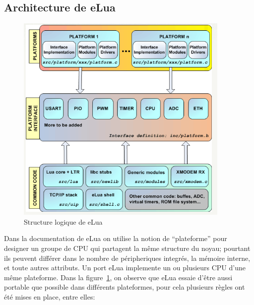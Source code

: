 \subsection{Architecture de eLua}

\begin{figure}[h]
\label{elua}
\begin{center}
\includegraphics[scale=0.6]{figure/eLua/schema.png}
\caption{Structure logique de eLua}

\end{center}
\end{figure}

  Dans la documentation de eLua on utilise la notion de ``plateforme'' pour designer un groupe de CPU qui partagent la même structure du noyau; pourtant
ils peuvent différer dans le nombre de péripheriques integrés, la mémoire interne, et toute autres attributs. Un port eLua implemente un ou plusieurs
CPU d'une même plateforme.
Dans la figure~\ref{elua}, on observe que eLua essaie d'être aussi portable que possible dans différents plateformes, pour cela plusieurs règles ont été mises en
place, entre elles:

